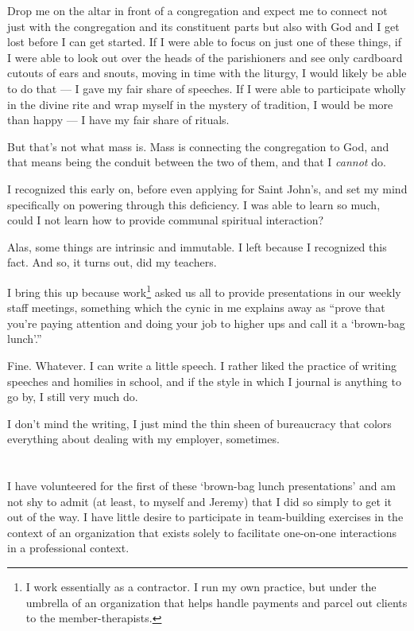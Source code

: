 Drop me on the altar in front of a congregation and expect me to connect not just with the congregation and its constituent parts but also with God and I get lost before I can get started. If I were able to focus on just one of these things, if I were able to look out over the heads of the parishioners and see only cardboard cutouts of ears and snouts, moving in time with the liturgy, I would likely be able to do that --- I gave my fair share of speeches. If I were able to participate wholly in the divine rite and wrap myself in the mystery of tradition, I would be more than happy --- I have my fair share of rituals.

But that's not what mass is. Mass is connecting the congregation to God, and that means being the conduit between the two of them, and that I \emph{cannot} do.

I recognized this early on, before even applying for Saint John's, and set my mind specifically on powering through this deficiency. I was able to learn so much, could I not learn how to provide communal spiritual interaction?

Alas, some things are intrinsic and immutable. I left because I recognized this fact. And so, it turns out, did my teachers.

I bring this up because work\footnote{I work essentially as a contractor. I run my own practice, but under the umbrella of an organization that helps handle payments and parcel out clients to the member-therapists.} asked us all to provide presentations in our weekly staff meetings, something which the cynic in me explains away as ``prove that you're paying attention and doing your job to higher ups and call it a `brown-bag lunch'.''

Fine. Whatever. I can write a little speech. I rather liked the practice of writing speeches and homilies in school, and if the style in which I journal is anything to go by, I still very much do.

I don't mind the writing, I just mind the thin sheen of bureaucracy that colors everything about dealing with my employer, sometimes.

\section{}

I have volunteered for the first of these `brown-bag lunch presentations' and am not shy to admit (at least, to myself and Jeremy) that I did so simply to get it out of the way. I have little desire to participate in team-building exercises in the context of an organization that exists solely to facilitate one-on-one interactions in a professional context.

